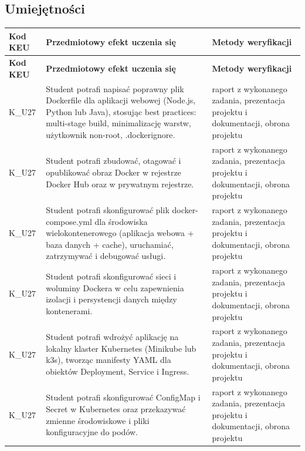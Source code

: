 \documentclass[12pt, a4paper]{article}
\newcommand{\thdrule}{\noalign{\global\setlength{\extrarowheight}{0pt}}}
\newcommand{\thdend}{\noalign{\global\setlength{\extrarowheight}{3pt}}}
\begin{document}
\subsection*{Umiejętności}
{\scriptsize
\begin{longtable}{m{1.6cm}m{9.0cm}m{4.2cm}}
\thdrule\toprule
\rowcolor{pjatkRed} {\color{white}\footnotesize\textbf{\vphantom{Ag}Kod KEU}} & {\color{white}\footnotesize\textbf{\vphantom{Ag}Przedmiotowy efekt uczenia się}} & {\color{white}\footnotesize\textbf{\vphantom{Ag}Metody weryfikacji}} \\
\midrule\thdend
\endfirsthead
\thdrule\toprule
\rowcolor{pjatkRed} {\color{white}\footnotesize\textbf{\vphantom{Ag}Kod KEU}} & {\color{white}\footnotesize\textbf{\vphantom{Ag}Przedmiotowy efekt uczenia się}} & {\color{white}\footnotesize\textbf{\vphantom{Ag}Metody weryfikacji}} \\
\midrule\thdend
\endhead
  \rowcolor{tableRowLight} K\_U27 & Student potrafi napisać poprawny plik Dockerfile dla aplikacji webowej (Node.js, Python lub Java), stosując best practices: multi-stage build, minimalizację warstw, użytkownik non-root, .dockerignore. & raport z wykonanego zadania, prezentacja projektu i dokumentacji, obrona projektu \\
  \rowcolor{tableRowAlt} K\_U27 & Student potrafi zbudować, otagować i opublikować obraz Docker w rejestrze Docker Hub oraz w prywatnym rejestrze. & raport z wykonanego zadania, prezentacja projektu i dokumentacji, obrona projektu \\
  \rowcolor{tableRowLight} K\_U27 & Student potrafi skonfigurować plik docker-compose.yml dla środowiska wielokontenerowego (aplikacja webowa + baza danych + cache), uruchamiać, zatrzymywać i debugować usługi. & raport z wykonanego zadania, prezentacja projektu i dokumentacji, obrona projektu \\
  \rowcolor{tableRowAlt} K\_U27 & Student potrafi skonfigurować sieci i woluminy Dockera w celu zapewnienia izolacji i persystencji danych między kontenerami. & raport z wykonanego zadania, prezentacja projektu i dokumentacji, obrona projektu \\
  \rowcolor{tableRowLight} K\_U27 & Student potrafi wdrożyć aplikację na lokalny klaster Kubernetes (Minikube lub k3s), tworząc manifesty YAML dla obiektów Deployment, Service i Ingress. & raport z wykonanego zadania, prezentacja projektu i dokumentacji, obrona projektu \\
  \rowcolor{tableRowAlt} K\_U27 & Student potrafi skonfigurować ConfigMap i Secret w Kubernetes oraz przekazywać zmienne środowiskowe i pliki konfiguracyjne do podów. & raport z wykonanego zadania, prezentacja projektu i dokumentacji, obrona projektu \\

\end{longtable}}
\end{document}
